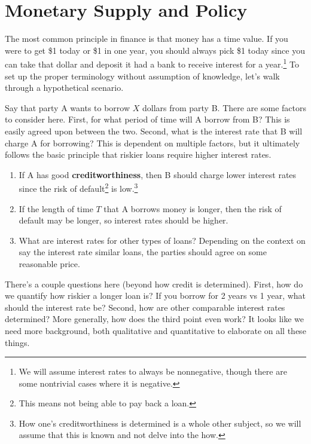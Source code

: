 \documentclass{article}
\begin{document}
\begin{enumerate}
  \end{enumerate}

\section{Monetary Supply and Policy}

    The most common principle in finance is that money has a time value. If you were to get \$1 today or \$1 in one year, you should always pick \$1 today since you can take that dollar and deposit it had a bank to receive interest for a year.\footnote{We will assume interest rates to always be nonnegative, though there are some nontrivial cases where it is negative.} To set up the proper terminology without assumption of knowledge, let's walk through a hypothetical scenario. 

    Say that party A wants to borrow $X$ dollars from party B. There are some factors to consider here. First, for what period of time will A borrow from B? This is easily agreed upon between the two. Second, what is the interest rate that B will charge A for borrowing? This is dependent on multiple factors, but it ultimately follows the basic principle that riskier loans require higher interest rates. 
    \begin{enumerate}
      \item If A has good \textbf{creditworthiness}, then B should charge lower interest rates since the risk of default\footnote{This means not being able to pay back a loan.} is low.\footnote{How one's creditworthiness is determined is a whole other subject, so we will assume that this is known and not delve into the how. }
      \item If the length of time $T$ that A borrows money is longer, then the risk of default may be longer, so interest rates should be higher. 
      \item What are interest rates for other types of loans? Depending on the context on say the interest rate similar loans, the parties should agree on some reasonable price.  
    \end{enumerate} 
    There's a couple questions here (beyond how credit is determined). First, how do we quantify how riskier a longer loan is? If you borrow for 2 years vs 1 year, what should the interest rate be? Second, how are other comparable interest rates determined? More generally, how does the third point even work? It looks like we need more background, both qualitative and quantitative to elaborate on all these things. 
\end{document}

